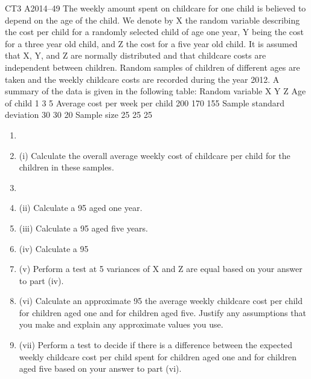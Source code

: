 \documentclass[a4paper,12pt]{article}
\begin{document}
\begin{enumerate}
CT3 A2014–49
The weekly amount spent on childcare for one child is believed to depend on the age of the child. We denote by X the random variable describing the cost per child for a randomly selected child of age one year, Y being the cost for a three year old child, and Z the cost for a five year old child. It is assumed that X, Y, and Z are normally distributed and that childcare costs are independent between children. Random samples of children of different ages are taken and the weekly childcare costs are
recorded during the year 2012. A summary of the data is given in the following table:
Random variable
X
Y
Z
Age of child
1
3
5
Average cost per week per child 200 170 155
Sample standard deviation
30 30 20
Sample size
25 25 25

\begin{enumerate}[\item (i)]
\item \item (i)
Calculate the overall average weekly cost of childcare per child for the
children in these samples.

\item \item (ii) Calculate a 95%
aged one year.

\item (iii) Calculate a 95%
aged five years.

\item (iv) Calculate a 95%

\item (v) Perform a test at 5%
variances of X and Z are equal based on your answer to part (iv).

\item (vi) Calculate an approximate 95%
the average weekly childcare cost per child for children aged one and for
children aged five. Justify any assumptions that you make and explain any
approximate values you use.

\item (vii) Perform a test to decide if there is a difference between the expected weekly
childcare cost per child spent for children aged one and for children aged five
based on your answer to part (vi).


\end{enumerate}
\end{enumerate}
\end{document}
